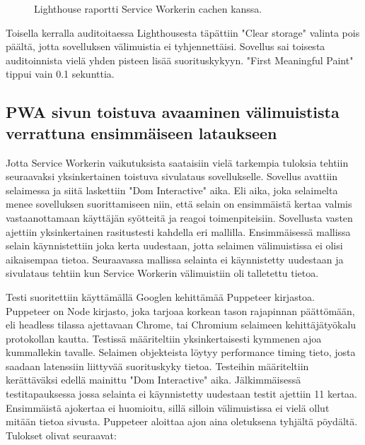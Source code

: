 \documentclass{tktltiki}
\begin{document}
\begin{figure}[h]
\begin{center}
\caption{Lighthouse raportti Service Workerin cachen kanssa.}
\label{Lighthouse raportti 3}
\end{center}
\end{figure}

Toisella kerralla auditoitaessa Lighthousesta täpättiin "Clear storage" valinta pois päältä, jotta sovelluksen välimuistia ei tyhjennettäisi. Sovellus sai toisesta auditoinnista vielä yhden pisteen lisää suorituskykyyn. "First Meaningful Paint" tippui vain 0.1 sekunttia.

\subsection{PWA sivun toistuva avaaminen välimuistista verrattuna ensimmäiseen lataukseen}

Jotta Service Workerin vaikutuksista saataisiin vielä tarkempia tuloksia tehtiin seuraavaksi yksinkertainen toistuva sivulataus sovellukselle. Sovellus avattiin selaimessa ja siitä laskettiin "Dom Interactive" aika. Eli aika, joka selaimelta menee sovelluksen suorittamiseen niin, että selain on ensimmäistä kertaa valmis vastaanottamaan käyttäjän syötteitä ja reagoi toimenpiteisiin. Sovellusta vasten ajettiin yksinkertainen rasitustesti kahdella eri mallilla. Ensimmäisessä mallissa selain käynnistettiin joka kerta uudestaan, jotta selaimen välimuistissa ei olisi aikaisempaa tietoa. Seuraavassa mallissa selainta ei käynnistetty uudestaan ja sivulataus tehtiin kun Service Workerin välimuistiin oli talletettu tietoa. 

Testi suoritettiin käyttämällä Googlen kehittämää Puppeteer kirjastoa. \cite{Google3} Puppeteer on Node kirjasto, joka tarjoaa korkean tason rajapinnan päättömään, eli headless tilassa ajettavaan Chrome, tai Chromium selaimeen kehittäjätyökalu protokollan kautta. Testissä määriteltiin yksinkertaisesti kymmenen ajoa kummallekin tavalle. Selaimen objekteista löytyy performance timing tieto, josta saadaan latenssiin liittyvää suorituskyky tietoa. Testeihin määriteltiin kerättäväksi edellä mainittu "Dom Interactive" aika. Jälkimmäisessä testitapauksessa jossa selainta ei käynnistetty uudestaan testit ajettiin 11 kertaa. Ensimmäistä ajokertaa ei huomioitu, sillä silloin välimuistissa ei vielä ollut mitään tietoa sivusta. Puppeteer aloittaa ajon aina oletuksena tyhjältä pöydältä. Tulokset olivat seuraavat:
\end{document}
